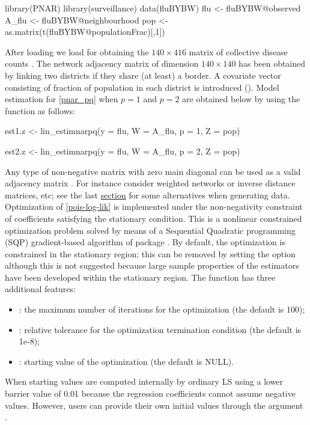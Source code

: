 \begin{example}
	
	library(PNAR)
	library(surveillance)
	data(fluBYBW)
	flu <- fluBYBW@observed
	A_flu <- fluBYBW@neighbourhood
	pop <- as.matrix(t(fluBYBW@populationFrac)[,1])
\end{example}

\noindent
After loading    we  load   for obtaining the $140 \times 416$ matrix of collective disease counts . The network adjacency matrix  of dimension $140 \times 140$ has been obtained by linking two districts if they share (at least) a border.  A covariate vector consisting of  fraction of population in each district is introduced ().     
Model estimation for \eqref{pnar_pq} when  $p=1$ and $p=2$ are obtained below  by using the function  as follows:

\begin{example}
	est1.z <- lin_estimnarpq(y = flu, W = A_flu, p = 1, Z = pop)
	
	est2.z <- lin_estimnarpq(y = flu, W = A_flu, p = 2, Z = pop)
\end{example}

\noindent
Any type of non-negative matrix with zero main diagonal can be used  as a valid adjacency matrix . For instance consider weighted networks or inverse distance matrices, etc;  see the last \hyperref[sec: Generate data]{section}
for some alternatives when generating data. 
Optimization of \eqref{pois-log-lik} is implemented  under the non-negativity constraint of coefficients  satisfying the  stationary condition. This is a nonlinear constrained optimization problem solved by means of a Sequential Quadratic programming (SQP) gradient-based algorithm \citep{kraft1994algorithm} of package  \citep{nloptr_2022}.
By default, the optimization is constrained in the stationary region; this can be removed by setting the option   although this is not suggested because  large sample properties of the estimators have been developed within the stationary region.
The function   has three additional features:
\begin{itemize}
	\item {}: the maximum number of iterations for the optimization (the default is 100);
	\item {}: relative tolerance for the optimization termination condition (the default is 1e-8);
	\item {}: starting value of the optimization (the default is NULL).
\end{itemize}
When   starting values are computed internally by ordinary LS  using a lower barrier value of 0.01 because the  regression coefficients cannot assume negative values. However,  users can provide their own initial values through the argument . 

